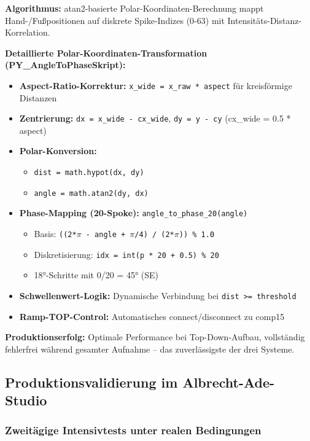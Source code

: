 \textbf{Algorithmus:} atan2-basierte Polar-Koordinaten-Berechnung mappt Hand-/Fußpositionen auf diskrete Spike-Indizes (0-63) mit Intensitäts-Distanz-Korrelation.

\textbf{Detaillierte Polar-Koordinaten-Transformation (PY\_AngleToPhaseSkript):}
\begin{itemize}
    \item \textbf{Aspect-Ratio-Korrektur:} \texttt{x\_wide = x\_raw * aspect} für kreisförmige Distanzen
    \item \textbf{Zentrierung:} \texttt{dx = x\_wide - cx\_wide}, \texttt{dy = y - cy} (cx\_wide = 0.5 * aspect)
    \item \textbf{Polar-Konversion:} 
    \begin{itemize}
        \item \texttt{dist = math.hypot(dx, dy)}
        \item \texttt{angle = math.atan2(dy, dx)}
    \end{itemize}
    \item \textbf{Phase-Mapping (20-Spoke):} \texttt{angle\_to\_phase\_20(angle)}
    \begin{itemize}
        \item Basis: \texttt{((2*$\pi$ - angle + $\pi$/4) / (2*$\pi$)) \% 1.0}
        \item Diskretisierung: \texttt{idx = int(p * 20 + 0.5) \% 20}
        \item 18°-Schritte mit 0/20 = 45° (SE)
    \end{itemize}
    \item \textbf{Schwellenwert-Logik:} Dynamische Verbindung bei \texttt{dist >= threshold}
    \item \textbf{Ramp-TOP-Control:} Automatisches connect/disconnect zu comp15
\end{itemize}

\textbf{Produktionserfolg:} Optimale Performance bei Top-Down-Aufbau, vollständig fehlerfrei während gesamter Aufnahme – das zuverlässigste der drei Systeme.

\subsection{Produktionsvalidierung im Albrecht-Ade-Studio}

\subsubsection{Zweitägige Intensivtests unter realen Bedingungen}

